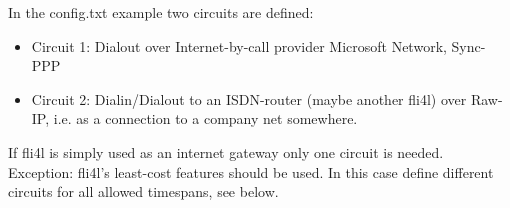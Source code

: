 In the config.txt example two circuits are defined:

\begin{itemize}
\item Circuit 1: Dialout over Internet-by-call provider Microsoft Network, Sync-PPP
  
\item Circuit 2: Dialin/Dialout to an ISDN-router (maybe another fli4l)
  over Raw-IP, i.e. as a connection to a company net somewhere.
  
\end{itemize}

If fli4l is simply used as an internet gateway only one circuit is needed. Exception: 
fli4l's least-cost features should be used. In this case define different circuits 
for all allowed timespans, see below.

